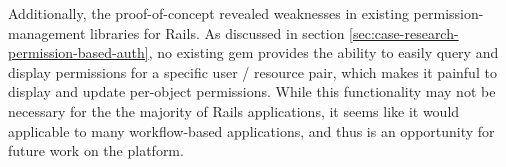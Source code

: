 \documentclass[document.tex]{subfiles}
\begin{document}
Additionally, the proof-of-concept revealed weaknesses in existing permission-management libraries for Rails. As discussed in section \ref{sec:case-research-permission-based-auth}, no existing gem provides the ability to easily query and display permissions for a specific user / resource pair, which makes it painful to display and update per-object permissions. While this functionality may not be necessary for the the majority of Rails applications, it seems like it would applicable to many workflow-based applications, and thus is an opportunity for future work on the platform.
\end{document}
